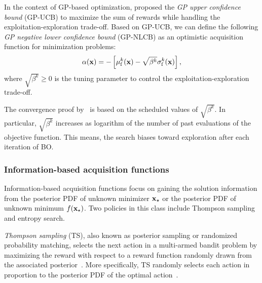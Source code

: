 \documentclass[iicol,sn-basic]{sn-jnl}%
\begin{document}
In the context of GP-based optimization, \cite{Srinivas2010} proposed the \textit{GP upper confidence bound} (GP-UCB) to maximize the sum of rewards while handling the exploitation-exploration trade-off.
Based on GP-UCB, we can define the following \textit{GP negative lower confidence bound} (GP-NLCB) as an optimistic acquisition function for minimization problems:
\begin{equation}\label{eqn42}
	\alpha({\bf x}) = -\left[\mu_\text{f}^k({\bf x})-\sqrt{\beta^k} \sigma_\text{f}^k({\bf x})\right],
\end{equation}
where $\sqrt{\beta^k} \geq 0$ is the tuning parameter to control the exploitation-exploration trade-off.

The convergence proof by~\cite{Srinivas2010} is based on the scheduled values of $\sqrt{\beta^k}$.
In particular, $\sqrt{\beta^k}$ increases as logarithm of the number of past evaluations of the objective function.
This means, the search biases toward exploration after each iteration of BO.

\subsubsection{Information-based acquisition functions}\label{Sec513}

Information-based acquisition functions focus on gaining the solution information from the posterior PDF of unknown minimizer ${\bf x}_\star$ or the posterior PDF of unknown minimum $f({\bf x}_\star)$.
Two policies in this class include Thompson sampling and entropy search.

\textit{Thompson sampling} (TS), also known as posterior sampling or randomized probability matching, selects the next action in a multi-armed bandit problem by maximizing the reward with respect to a reward function randomly drawn from the associated posterior~\citep[see e.g.,][]{Chapelle2011,Agrawal2012,Bijl2016}.
More specifically, TS randomly selects each action in proportion to the posterior PDF of the optimal action~\citep{Scott2010}.
\end{document}
